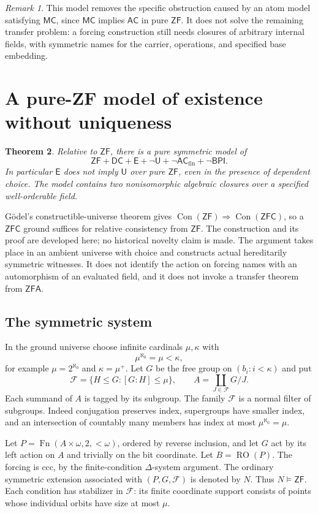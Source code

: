 \documentclass[11pt,a4paper]{article}
\newtheorem{theorem}{Theorem}[section]
\theoremstyle{definition}\newtheorem{definition}[theorem]{Definition}
\theoremstyle{remark}\newtheorem{remark}[theorem]{Remark}
\newcommand{\ZF}{\mathsf{ZF}}\newcommand{\ZFA}{\mathsf{ZFA}}
\newcommand{\AC}{\mathsf{AC}}\newcommand{\BPI}{\mathsf{BPI}}
\newcommand{\E}{\mathsf E}\newcommand{\U}{\mathsf U}
\newcommand{\ACfin}{\mathsf{AC}_{\mathrm{fin}}}
\begin{document}
\begin{remark}
This model removes the specific obstruction caused by an atom model satisfying $\mathsf{MC}$, since $\mathsf{MC}$ implies $\AC$ in pure $\ZF$. It does not solve the remaining transfer problem: a forcing construction still needs closures of arbitrary internal fields, with symmetric names for the carrier, operations, and specified base embedding.
\end{remark}

\section{A pure-ZF model of existence without uniqueness}\label{sec:pure-separation}
\begin{theorem}\label{thm:pure-zf-separation}
Relative to $\ZF$, there is a pure symmetric model of
\[
\ZF+\mathsf{DC}+\E+\neg\U+\neg\ACfin+\neg\BPI.
\]
In particular $\E$ does not imply $\U$ over pure $\ZF$, even in the presence of dependent choice. The model contains two nonisomorphic algebraic closures over a specified well-orderable field.
\end{theorem}
G\"odel's constructible-universe theorem gives $\operatorname{Con}(\ZF)\Rightarrow\operatorname{Con}(\mathsf{ZFC})$, so a $\mathsf{ZFC}$ ground suffices for relative consistency from $\ZF$.
The construction and its proof are developed here; no historical novelty claim is made. The argument takes place in an ambient universe with choice and constructs actual hereditarily symmetric witnesses. It does not identify the action on forcing names with an automorphism of an evaluated field, and it does not invoke a transfer theorem from $\ZFA$.

\subsection{The symmetric system}
In the ground universe choose infinite cardinals $\mu,\kappa$ with
\[
\mu^{\aleph_0}=\mu<\kappa,
\]
for example $\mu=2^{\aleph_0}$ and $\kappa=\mu^+$. Let $G$ be the free group on $(b_i:i<\kappa)$ and put
\[
\mathcal F=\{H\leq G:[G:H]\leq\mu\},\qquad
A=\coprod_{J\in\mathcal F}G/J.
\]
Each summand of $A$ is tagged by its subgroup. The family $\mathcal F$ is a normal filter of subgroups. Indeed conjugation preserves index, supergroups have smaller index, and an intersection of countably many members has index at most $\mu^{\aleph_0}=\mu$.

Let $P=\operatorname{Fn}(A\times\omega,2,{<}\omega)$, ordered by reverse inclusion, and let $G$ act by its left action on $A$ and trivially on the bit coordinate. Let $B=\operatorname{RO}(P)$. The forcing is ccc, by the finite-condition $\Delta$-system argument. The ordinary symmetric extension associated with $(P,G,\mathcal F)$ is denoted by $N$. Thus $N\models\ZF$. Each condition has stabilizer in $\mathcal F$: its finite coordinate support consists of points whose individual orbits have size at most $\mu$.
\end{document}
